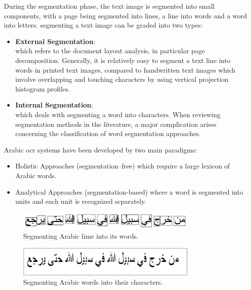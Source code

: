 \begin{itemize}[labelindent=1em,labelsep=0.25cm,leftmargin=*]
        During the segmentation phase, the text image is segmented into small components, with a page being segmented into lines, a line into words and a word into letters.
segmenting a text image can be graded into two types: 

\begin{itemize}[itemsep=1pt, topsep=5pt]
    \item \textbf{External Segmentation}:\\
    which refers to the document layout analysis, in particular page decomposition. Generally, it is relatively easy to segment a text line into words in printed text images, compared to handwritten text images which involve overlapping and touching characters by using vertical projection histogram profiles.

    \item \textbf{Internal Segmentation}:\\
    which deals with segmenting a word into characters. When reviewing segmentation methods in the literature, a major complication arises concerning the classification of word segmentation approaches.
\end{itemize} 

\clearpage

Arabic \acrshort{ocr} systems have been developed by two main paradigms: 
\begin{itemize}[itemsep=1pt, topsep=5pt]
    \item Holistic Approaches (segmentation–free) which require a large lexicon of Arabic words.
    \item Analytical Approaches (segmentation-based) where a word is segmented into units and each unit is recognized separately.
\end{itemize} 

\textbf{}
\begin{figure}[H]
    \centering
    \includegraphics[width=9cm]{images/word.png}
    \caption{Segmenting Arabic lime into its words.}
    \label{fig:word}
\end{figure}

\textbf{}
\begin{figure}[H]
    \centering
    \includegraphics[width=9cm]{images/char.png}
    \caption{Segmenting Arabic words into their characters.}
    \label{fig:char}
\end{figure}


\end{itemize}

